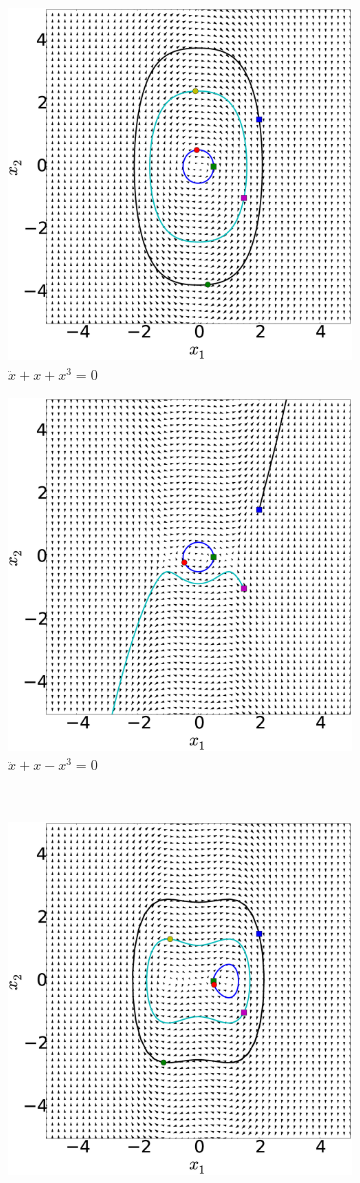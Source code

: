 \documentclass[14pt, a4paper]{extreport}
\begin{document}
%
\begin{figure}[H]
    \centering
    \begin{subfigure}[t]{7 cm}
        \centering
        \includegraphics[height=7 cm]{figure/2A.eps}
        \caption{$\ddot{x} + x + x^3 = 0$}
    \end{subfigure}
    \quad
    \begin{subfigure}[t]{7 cm}
        \centering
        \includegraphics[height=7 cm]{figure/2B.eps}
        \caption{$\ddot{x} + x - x^3 = 0$}
    \end{subfigure}
    \\
    \begin{subfigure}[t]{7 cm}
        \centering
        \includegraphics[height=7 cm]{figure/2C.eps}

\end{subfigure}
\end{figure}
\end{document}
